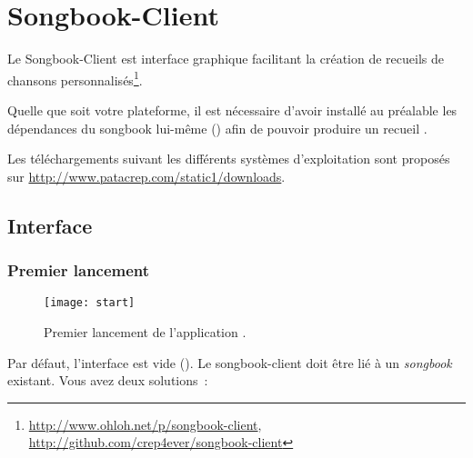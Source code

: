 \chapter{Songbook-Client}
\setcounter{chapter}{2}
\label{chap:songbook-client}
\minitoc
\newpage

Le Songbook-Client est interface graphique facilitant la création de
recueils de chansons
personnalisés\footnote{\url{http://www.ohloh.net/p/songbook-client},
  \url{http://github.com/crep4ever/songbook-client}}.

\begin{nota}
Quelle que soit votre plateforme, il est nécessaire d'avoir installé
au préalable les dépendances du songbook lui-même
() afin de pouvoir produire un recueil .
\end{nota}

Les téléchargements suivant les différents systèmes d'exploitation
sont proposés sur \url{http://www.patacrep.com/static1/downloads}.


\section{Interface}

\subsection{Premier lancement}

\begin{figure}
  \centering
  \texttt{[image: start]}
  \caption{Premier lancement de l'application \client.}
  \label{fig:start}
\end{figure}

Par défaut, l'interface est vide (). Le
songbook-client doit être lié à un \emph{songbook} existant. Vous avez
deux solutions~:

